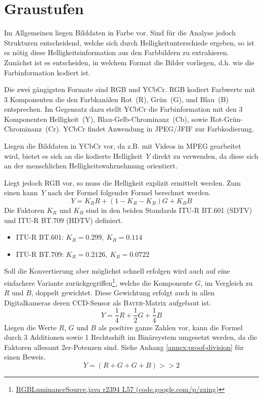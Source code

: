 \section{Graustufen}
\label{sec:grayscaling}
\writtenby{\dcauthornameewie}%
Im Allgemeinen liegen Bilddaten in Farbe vor.
Sind für die Analyse jedoch Strukturen entscheidend, welche sich durch Helligkeitunterschiede ergeben, so ist es nötig diese Helligkeitsinformation aus den Farbbildern zu extrahieren.
Zunächst ist es entscheiden, in welchem Format die Bilder vorliegen, d.h. wie die Farbinformation kodiert ist.

Die zwei gängigsten Formate sind RGB und YCbCr.
RGB kodiert Farbwerte mit 3 Komponenten die den Farbkanälen Rot~(R), Grün~(G), und Blau~(B) entsprechen.
Im Gegensatz dazu stellt YCbCr die Farbinformation mit den 3 Komponenten Helligkeit~(Y), Blau-Gelb-Chrominanz~(Cb), sowie Rot-Grün-Chrominanz~(Cr).
YCbCr findet Anwendung in JPEG/JFIF \cite{jfif} zur Farbkodierung.

Liegen die Bilddaten in YCbCr vor, da z.B. mit Videos in MPEG gearbeitet wird, bietet es sich an die kodierte Helligkeit~$Y$ direkt zu verwenden, da diese sich an der menschlichen Helligkeitswahrnehmung orientiert.

Liegt jedoch RGB vor, so muss die Helligkeit explizit ermittelt werden.
Zum einen kann~$Y$ nach der Formel folgender Formel \cite[2.5.1]{itu/rec/601} berechnet werden.
\begin{equation}
  Y = K_R R + (1 - K_R - K_B) G + K_B B
\end{equation}
Die Faktoren $K_R$ und $K_B$ sind in den beiden Standards ITU-R BT.601 (SDTV) und ITU-R BT.709 (HDTV) definiert.
%
\begin{itemize}
\item ITU-R BT.601: $K_R=0.299,~K_B=0.114$ \cite[2.5.1]{itu/rec/601}
\item ITU-R BT.709: $K_R=0.2126,~K_B=0.0722$ \cite[4]{itu/rec/709}
\end{itemize}
%
Soll die Konvertierung aber möglichst schnell erfolgen wird auch auf eine einfachere Variante zurückgegriffen\footnote{\href{https://code.google.com/p/zxing/source/browse/trunk/core/src/com/google/zxing/RGBLuminanceSource.java?spec=svn2633&r=2394\#57}{RGBLuminanceSource.java r2394 L57 (code.google.com/p/zxing)}}, welche die Komponente $G$, im Vergleich zu $R$ und $B$, doppelt gewichtet.
Diese Gewichtung erfolgt auch in allen Digitalkameras deren CCD-Sensor als \textsc{Bayer}-Matrix aufgebaut ist.
\begin{equation}
  Y = \frac{1}{4} R + \frac{1}{2} G + \frac{1}{4}B
\end{equation}
Liegen die Werte $R$, $G$ und $B$ als positive ganze Zahlen vor, kann die Formel durch 3 Additionen sowie 1 Rechtsshift im Binärsystem umgesetzt werden, da die Faktoren allesamt 2er-Potenzen sind.
Siehe Anhang \ref{annex:proof-division} für einen Beweis.
\begin{equation}
  Y = (R + G + G + B) >\!\!> 2
\end{equation}
